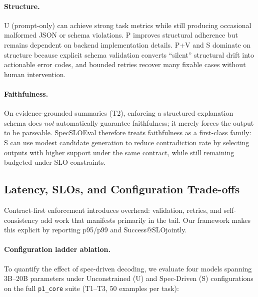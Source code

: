 \documentclass[11pt]{article}
\newcommand{\slo}{\ensuremath{\mathrm{SLO}}}
\begin{document}
\paragraph{Structure.}
U (prompt-only) can achieve strong task metrics while still producing occasional malformed JSON or schema violations.
P improves structural adherence but remains dependent on backend implementation details.
P+V and S dominate on structure because explicit schema validation converts “silent” structural drift into actionable error codes, and bounded retries recover many fixable cases without human intervention.

\paragraph{Faithfulness.}
On evidence-grounded summaries (T2), enforcing a structured explanation schema does \emph{not} automatically guarantee faithfulness; it merely forces the output to be parseable.
SpecSLOEval therefore treats faithfulness as a first-class family: S can use modest candidate generation to reduce contradiction rate by selecting outputs with higher support under the same contract, while still remaining budgeted under SLO constraints.

\subsection{Latency, SLOs, and Configuration Trade-offs}
\label{sec:results-slo}

Contract-first enforcement introduces overhead: validation, retries, and self-consistency add work that manifests primarily in the tail.
Our framework makes this explicit by reporting p95/p99 and Success@\slo jointly.

\paragraph{Configuration ladder ablation.}
To quantify the effect of spec-driven decoding, we evaluate four models spanning 3B--20B parameters under Unconstrained (U) and Spec-Driven (S) configurations on the full \texttt{p1\_core} suite (T1--T3, 50 examples per task):
\end{document}
